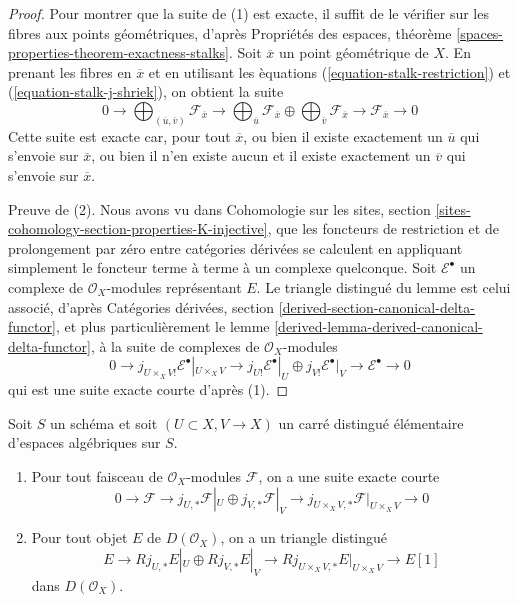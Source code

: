 \begin{proof}
Pour montrer que la suite de (1) est exacte, il suffit de le v\'erifier sur
les fibres aux points g\'eom\'etriques, d'apr\`es Propri\'et\'es des espaces,
th\'eor\`eme
\ref{spaces-properties-theorem-exactness-stalks}.
Soit $\overline{x}$ un point g\'eom\'etrique de $X$. En prenant les fibres en
$\overline{x}$ et en utilisant les \`equations
(\ref{equation-stalk-restriction}) et (\ref{equation-stalk-j-shriek}), on
obtient la suite
$$
0 \to
\bigoplus\nolimits_{(\overline{u}, \overline{v})} \mathcal{F}_{\overline{x}}
\to
\bigoplus\nolimits_{\overline{u}} \mathcal{F}_{\overline{x}}
\oplus
\bigoplus\nolimits_{\overline{v}} \mathcal{F}_{\overline{x}}
\to
\mathcal{F}_{\overline{x}} \to 0
$$
Cette suite est exacte car, pour tout $\overline{x}$, ou bien il existe
exactement un $\overline{u}$ qui s'envoie sur $\overline{x}$, ou bien il
n'en existe aucun et il existe exactement un $\overline{v}$ qui s'envoie
sur $\overline{x}$.

\medskip\noindent
Preuve de (2). Nous avons vu dans Cohomologie sur les sites, section
\ref{sites-cohomology-section-properties-K-injective}, que les foncteurs de
restriction et de prolongement par z\'ero entre cat\'egories d\'eriv\'ees se
calculent en appliquant simplement le foncteur terme \`a terme \`a un
complexe quelconque. Soit $\mathcal{E}^\bullet$ un complexe de
$\mathcal{O}_X$-modules repr\'esentant $E$. Le triangle distingu\'e du lemme
est celui associ\'e, d'apr\`es Cat\'egories d\'eriv\'ees, section
\ref{derived-section-canonical-delta-functor}, et plus particuli\`erement le
lemme \ref{derived-lemma-derived-canonical-delta-functor}, \`a la suite de
complexes de $\mathcal{O}_X$-modules
$$
0 \to j_{U \times_X V!}\mathcal{E}^\bullet|_{U \times_X V} \to
j_{U!}\mathcal{E}^\bullet|_U \oplus j_{V!}\mathcal{E}^\bullet|_V
\to \mathcal{E}^\bullet \to 0
$$
qui est une suite exacte courte d'apr\`es (1).
\end{proof}

\begin{lemma}
\label{lemma-exact-sequence-j-star}
Soit $S$ un sch\'ema et soit $(U \subset X, V \to X)$ un carr\'e distingu\'e
\'el\'ementaire d'espaces alg\'ebriques sur $S$.
\begin{enumerate}
\item Pour tout faisceau de $\mathcal{O}_X$-modules $\mathcal{F}$, on a une
suite exacte courte
$$
0 \to \mathcal{F} \to
j_{U, *}\mathcal{F}|_U \oplus j_{V, *}\mathcal{F}|_V \to
j_{U \times_X V, *}\mathcal{F}|_{U \times_X V} \to 0
$$
\item Pour tout objet $E$ de $D(\mathcal{O}_X)$, on a un triangle distingu\'e
$$
E \to 
Rj_{U, *}E|_U \oplus Rj_{V, *}E|_V \to
Rj_{U \times_X V, *}E|_{U \times_X V} \to
E[1]
$$
dans $D(\mathcal{O}_X)$.
\end{enumerate}
\end{lemma}

